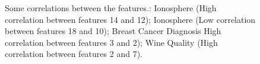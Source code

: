 \documentclass{article}
\begin{document}
\begin{figure}
%
\hspace{8pt}%
%
\caption[Some correlations between
the features.]{Some correlations between
the features.:
 Ionosphere (High correlation between features 14 and 12);
 Ionosphere (Low correlation between features 18 and 10);
 Breast Cancer Diagnosis High correlation between features 3 and 2);
 Wine Quality (High correlation between features 2 and 7).}%
\label{fig:ex3}%
\end{figure}
\end{document}

